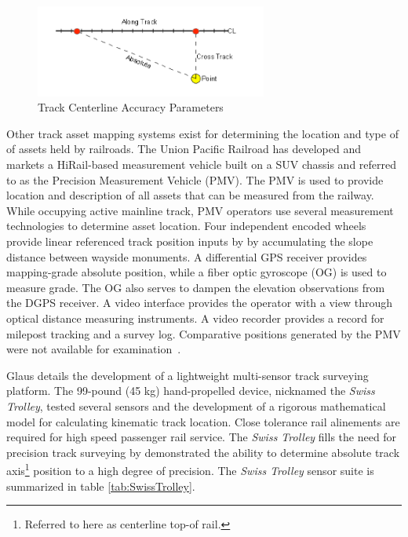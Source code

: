 \begin{figure}[!htp]
\begin{center}
	\includegraphics[width=3in]{graphics/AllenTrackRef.png}
	\caption{Track Centerline Accuracy Parameters~\citep{2006AllenAssetMap}}
	\label{fig:trackRef}
\end{center}
\end{figure}

Other track asset mapping systems exist for determining the location and type of of assets held by railroads. The Union Pacific Railroad has developed and markets a HiRail-based measurement vehicle built on a SUV chassis and referred to as the Precision Measurement Vehicle (PMV). The PMV is used to provide location and description of all assets that can be measured from the railway. While occupying active mainline track, PMV operators use several measurement technologies to determine asset location. Four independent encoded wheels provide linear referenced track position inputs by by accumulating the slope distance between wayside monuments. A differential GPS receiver provides mapping-grade absolute position, while a fiber optic gyroscope (OG) is used to measure grade. The OG also serves to dampen the elevation observations from the DGPS receiver. A video interface provides the operator with a view through optical distance measuring instruments. A video recorder provides a record for milepost tracking and a survey log. Comparative positions generated by the PMV were not available for examination~\citep{2008pmv}.

Glaus details the development of a lightweight multi-sensor track surveying platform. The 99-pound (45 kg) hand-propelled device, nicknamed the \emph{Swiss Trolley}, tested several sensors and the development of a rigorous mathematical model for calculating kinematic track location. Close tolerance rail alinements are required for high speed passenger rail service. The \emph{Swiss Trolley} fills the need for precision track surveying by demonstrated the ability to determine absolute track axis\footnote{Referred to here as centerline top-of rail.} position to a high degree of precision. The \emph{Swiss Trolley} sensor suite is summarized in table \ref{tab:SwissTrolley}.

